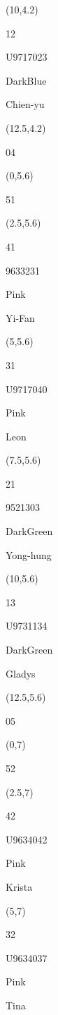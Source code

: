 \documentclass[a4paper]{article}
\newcommand{\myseat}[4]{%
\vspace{-0.1cm}
\parbox[t][2.2cm][t]{3.5cm}{
\small #1 %
\begin{description}
\vspace{-0.1cm}
\item [ID:] #2
\vspace{-0.1cm}
\item [Team:] #3 \normalsize
\vspace{-0.1cm}
\item \normalsize #4
\vspace{-0.1cm}
\end{description}
}
}
\begin{document}
\begin{CJK}{UTF8}{cyberbit}
\begin{textblock}{2.5}(10,4.2)
	\myseat{12}{U9717023}{DarkBlue}{Chien-yu}
\end{textblock}

\begin{textblock}{2.5}(12.5,4.2)
\textblockcolor{}
	\myseat{04}{}{}{}
\end{textblock}

\begin{textblock}{2.5}(0,5.6)
\textblockcolor{}
\myseat{51}{}{}{}
\end{textblock}

\begin{textblock}{2.5}(2.5,5.6)
\myseat{41}{9633231}{Pink}{Yi-Fan}
\end{textblock}

\begin{textblock}{2.5}(5,5.6)
\myseat{31}{U9717040}{Pink}{Leon}
\end{textblock}

\begin{textblock}{2.5}(7.5,5.6)
\myseat{21}{9521303}{DarkGreen}{Yong-hung}
\end{textblock}

\begin{textblock}{2.5}(10,5.6)
\myseat{13}{U9731134}{DarkGreen}{Gladys}
\end{textblock}

\begin{textblock}{2.5}(12.5,5.6)
\textblockcolor{}
\myseat{05}{}{}{}
\end{textblock}

\begin{textblock}{2.5}(0,7)
\textblockcolor{}
\myseat{52}{}{}{}
\end{textblock}

\begin{textblock}{2.5}(2.5,7)
\myseat{42}{U9634042}{Pink}{Krista}
\end{textblock}

\begin{textblock}{2.5}(5,7)
\myseat{32}{U9634037}{Pink}{Tina}
\end{textblock}


\end{CJK}
\end{document}
